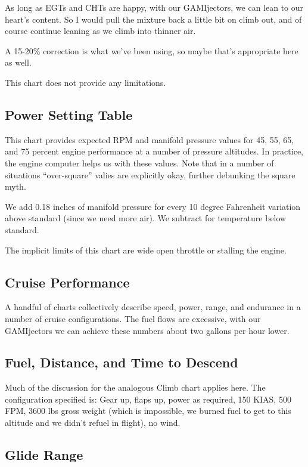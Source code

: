 As long as EGTs and CHTs are happy, with our GAMIjectors, we can lean to our heart's content. So I would pull the mixture back a little bit on climb out, and of course continue leaning as we climb into thinner air.

A 15-20\% correction is what we've been using, so maybe that's appropriate here as well.

This chart does not provide any limitations.

\subsection{Power Setting Table}

This chart provides expected RPM and manifold pressure values for 45, 55, 65, and 75 percent engine performance at a number of pressure altitudes. In practice, the engine computer helps us with these values. Note that in a number of situations ``over-square'' valies are explicitly okay, further debunking the square myth.

We add 0.18 inches of manifold pressure for every 10 degree Fahrenheit variation above standard (since we need more air). We subtract for temperature below standard.

The implicit limits of this chart are wide open throttle or stalling the engine.

\subsection{Cruise Performance}

A handful of charts collectively describe speed, power, range, and endurance in a number of cruise configurations. The fuel flows are excessive, with our GAMIjectors we can achieve these numbers about two gallons per hour lower.

\subsection{Fuel, Distance, and Time to Descend}

Much of the discussion for the analogous Climb chart applies here. The configuration specified is: Gear up, flaps up, power as required, 150 KIAS, 500 FPM, 3600 lbs gross weight (which is impossible, we burned fuel to get to this altitude and we didn't refuel in flight), no wind.

\subsection{Glide Range}

